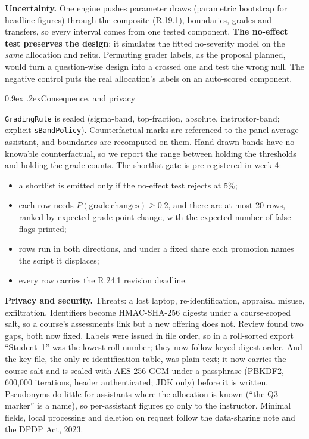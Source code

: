 \documentclass[10pt,a4paper]{article}
\makeatletter
\renewcommand\subsection{\@startsection{subsection}{2}{\z@}{-2.4ex \@plus -.5ex \@minus -.2ex}%
  {0.9ex \@plus .2ex}{\normalfont\large\bfseries}}
\makeatother
\begin{document}
\textbf{Uncertainty.} One engine pushes parameter draws (parametric bootstrap for headline figures)
through the composite (R.19.1), boundaries, grades and transfers, so every interval comes from one
tested component. \textbf{The no-effect test preserves the design}: it simulates the fitted
no-severity model on the \emph{same} allocation and refits. Permuting grader labels, as the proposal
planned, would turn a question-wise design into a crossed one and test the wrong null. The negative
control puts the real allocation's labels on an auto-scored component.

\subsection{Consequence, and privacy}

\texttt{GradingRule} is sealed (sigma-band, top-fraction, absolute, instructor-band; explicit
\texttt{sBandPolicy}). Counterfactual marks are referenced to the panel-average assistant, and
boundaries are recomputed on them. Hand-drawn bands have no knowable counterfactual, so we report
the range between holding the thresholds and holding the grade counts. The shortlist gate is
pre-registered in week 4:
\begin{itemize}
\item a shortlist is emitted only if the no-effect test rejects at 5\%;
\item each row needs $P(\mathrm{grade\ changes})\ge 0.2$, and there are at most 20 rows, ranked by
expected grade-point change, with the expected number of false flags printed;
\item rows run in both directions, and under a fixed share each promotion names the script it
displaces;
\item every row carries the R.24.1 revision deadline.
\end{itemize}

\textbf{Privacy and security.} Threats: a lost laptop, re-identification, appraisal misuse,
exfiltration. Identifiers become HMAC-SHA-256 digests under a course-scoped salt, so a course's
assessments link but a new offering does not. Review found two gaps, both now fixed. Labels were
issued in file order, so in a roll-sorted export ``Student~1'' was the lowest roll number; they now
follow keyed-digest order. And the key file, the only re-identification table, was plain text; it
now carries the course salt and is sealed with AES-256-GCM under a passphrase (PBKDF2, 600,000
iterations, header authenticated; JDK only) before it is written. Pseudonyms do little for assistants
where the allocation is known (``the Q3 marker'' is a name), so per-assistant figures go only to the
instructor. Minimal fields, local processing and deletion on request follow the data-sharing note
and the DPDP Act, 2023.
\end{document}
